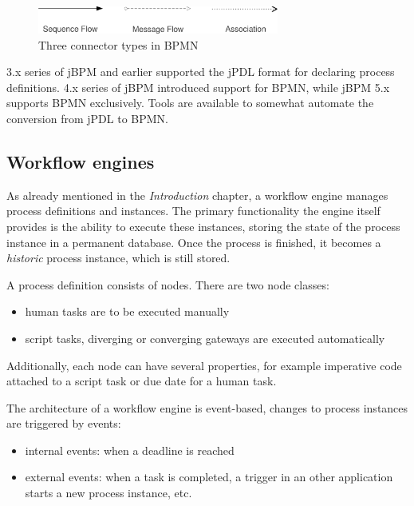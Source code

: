 \begin{figure}[H]
\centering
\includegraphics[width=300px,keepaspectratio]{bpmn-connector-types.pdf}
\caption{Three connector types in BPMN}
\label{fig:bpmn-connector-types}
\end{figure}


3.x series of jBPM and earlier supported the jPDL format for declaring process definitions.
4.x series of jBPM introduced support for BPMN, while jBPM 5.x supports BPMN exclusively.
Tools are available to somewhat automate the conversion from jPDL to BPMN.

\subsection{Workflow engines}


As already mentioned in the \emph{Introduction} chapter, a workflow engine
manages process definitions and instances. The primary functionality the engine
itself provides is the ability to execute these instances, storing the state of
the process instance in a permanent database. Once the process is finished, it
becomes a \emph{historic} process instance, which is still stored.

A process definition consists of nodes. There are two node classes:

\begin{itemize}
\item human tasks are to be executed manually
\item script tasks, diverging or converging gateways are executed automatically
\end{itemize}

Additionally, each node can have several properties, for example imperative code
attached to a script task or due date for a human task.

The architecture of a workflow engine is event-based, changes to process
instances are triggered by events:

\begin{itemize}
\item internal events: when a deadline is reached
\item external events: when a task is completed, a trigger in an other
application starts a new process instance, etc.
\end{itemize}

